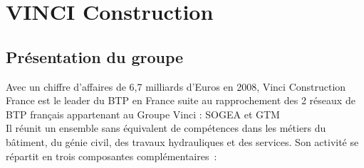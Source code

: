 \section {VINCI Construction}

\subsection{Présentation du groupe}

Avec un chiffre d’affaires de 6,7 milliards d’Euros en 2008, Vinci Construction France est le leader du BTP en France suite au rapprochement des 2 réseaux de BTP français appartenant au Groupe Vinci : SOGEA et GTM \\

Il réunit un ensemble sans équivalent de compétences dans les métiers du bâtiment, du génie civil, des travaux hydrauliques et des services.
Son activité se répartit en trois composantes complémentaires :

